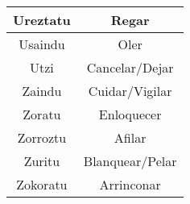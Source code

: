 \documentclass[11pt, a4paper]{article}
\begin{document}
\begin{longtable}{cc}
\hline
Ureztatu                   & Regar                       \\ 
\hline
Usaindu                    & Oler                        \\ 
\hline
Utzi                       & Cancelar/Dejar              \\ 
\hline
Zaindu                     & Cuidar/Vigilar              \\ 
\hline
Zoratu                     & Enloquecer                  \\ 
\hline
Zorroztu                   & Afilar                      \\ 
\hline
Zuritu                     & Blanquear/Pelar             \\ 
\hline
Zokoratu                   & Arrinconar                  \\
\hline
\end{longtable}
\end{document}
